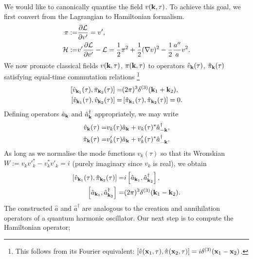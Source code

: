 We would like to canonically quantise the field $v(\mathbf{k},\tau)$. To achieve this goal, we first convert from the Lagrangian to Hamiltonian formalism.
\begin{align}
	\pi :=& \frac{\partial \mathcal{L}}{\partial v'} = v', \\
	\mathcal{H} :=& v'\frac{\partial \mathcal{L}}{\partial v'} - \mathcal{L} = \frac{1}{2} \pi^2 + \frac{1}{2} (\nabla v)^2 - \frac{1}{2} \frac{a''}{a} v^2 .
\end{align}
We now promote classical fields $v(\mathbf{k},\tau)$, $\pi(\mathbf{k},\tau)$ to operators $\hat{v}_\mathbf{k}(\tau)$, $\hat{\pi}_\mathbf{k}(\tau)$ satisfying equal-time commutation relations \footnote{This follows from its Fourier equivalent: $[\hat{v}(\mathbf{x}_1,\tau),\hat{\pi}(\mathbf{x}_2,\tau)] = i\delta^{(3)}(\mathbf{x}_1 - \mathbf{x}_2)$.}
\begin{align}
	\left[ \hat{v}_{\mathbf{k}_1}(\tau), \hat{\pi}_{\mathbf{k}_2}(\tau) \right] =& (2\pi)^3 \delta^{(3)}(\mathbf{k}_1 + \mathbf{k}_2), \\
	\left[ \hat{v}_{\mathbf{k}_1}(\tau), \hat{v}_{\mathbf{k}_2}(\tau) \right] =& \left[ \hat{\pi}_{\mathbf{k}_1}(\tau), \hat{\pi}_{\mathbf{k}_2}(\tau) \right] = 0.
\end{align}
Defining operators $\hat{a}_\mathbf{k}$ and $\hat{a}_\mathbf{k}^\dagger$ appropriately, we may write
\begin{align}
	\hat{v}_\mathbf{k} (\tau) =& v_k(\tau) \hat{a}_\mathbf{k} + v_k(\tau)^* \hat{a}_{-\mathbf{k}}^\dagger,  \\
	\hat{\pi}_\mathbf{k} (\tau) =& {v'_k}(\tau) \hat{a}_\mathbf{k} + {v'_k}(\tau)^* \hat{a}_{-\mathbf{k}}^\dagger.
\end{align}
As long as we normalise the mode functions $v_k(\tau)$ so that its Wronskian $W := v_k v'^*_k - v_k^* v'_k = i$ (purely imaginary since $v_k$ is real), we obtain
\begin{align}
	\left[ \hat{v}_{\mathbf{k}_1}(\tau), \hat{\pi}_{\mathbf{k}_2}(\tau) \right] =& i \left[ \hat{a}_{\mathbf{k}_1}, \hat{a}^\dagger_{\mathbf{k}_2} \right], \\
	\left[ \hat{a}_{\mathbf{k}_1}, \hat{a}^\dagger_{\mathbf{k}_2} \right] =& (2\pi)^3 \delta^{(3)}(\mathbf{k}_1 - \mathbf{k}_2).	\label{eqn:canonical_quantisation_commutation_relation_a}
\end{align}
The constructed $\hat{a}$ and $\hat{a}^\dagger$ are analogous to the creation and annihilation operators of a quantum harmonic oscillator. Our next step is to compute the Hamiltonian operator;
